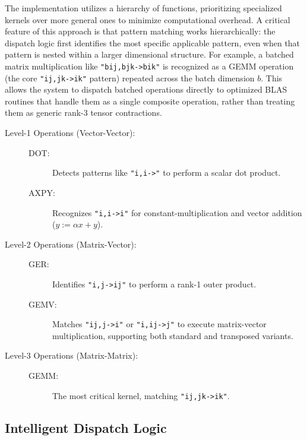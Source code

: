 \documentclass[binding=0.6cm]{sapthesis}
\begin{document}
The implementation utilizes a hierarchy of functions, prioritizing specialized kernels over more general ones to minimize computational overhead. A critical feature of this approach is that pattern matching works hierarchically: the dispatch logic first identifies the most specific applicable pattern, even when that pattern is nested within a larger dimensional structure. For example, a batched matrix multiplication like \texttt{"bij,bjk->bik"} is recognized as a GEMM operation (the core \texttt{"ij,jk->ik"} pattern) repeated across the batch dimension $b$. This allows the system to dispatch batched operations directly to optimized BLAS routines that handle them as a single composite operation, rather than treating them as generic rank-3 tensor contractions.

\begin{description}
	\item [Level-1 Operations (Vector-Vector):]
	      \begin{description}
		      \item [DOT:] Detects patterns like \texttt{"i,i->"} to perform a scalar dot product.
		      \item [AXPY:] Recognizes \texttt{"i,i->i"} for constant-multiplication and vector addition ($y := \alpha x + y$).
	      \end{description}

	\item [Level-2 Operations (Matrix-Vector):]
	      \begin{description}
		      \item [GER:] Identifies \texttt{"i,j->ij"} to perform a rank-1 outer product.
		      \item [GEMV:] Matches \texttt{"ij,j->i"} or \texttt{"i,ij->j"} to execute matrix-vector multiplication, supporting both standard and transposed variants.
	      \end{description}

	\item [Level-3 Operations (Matrix-Matrix):]
	      \begin{description}
		      \item [GEMM:] The most critical kernel, matching \texttt{"ij,jk->ik"}.
	      \end{description}
\end{description}

\subsection{Intelligent Dispatch Logic}
\end{document}
